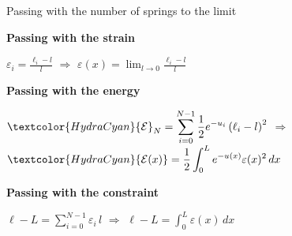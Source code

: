 \begin{frame}{Passing with the number of springs to the limit}

  \vspace{-0.04cm}

  \begin{center}
    \begin{minipage}{0.94\linewidth}

      {\color{HydraWhite}\bfseries\fontsize{8.2}{9.8}\selectfont Passing with the strain\par}
      \vspace{-0.06cm}
      \begin{center}
        {\color{HydraWhite}\fontsize{9.4}{11.8}\selectfont
          $\displaystyle\varepsilon_i=\frac{\ell_i-l}{l}$
        }
        \quad
        {\color{HydraCyan}\fontsize{13}{13}\selectfont$\Rightarrow$}
        \quad
        {\color{HydraWhite}\bfseries\fontsize{9.4}{11.8}\selectfont
          ${\displaystyle\varepsilon(x)=\lim_{l\to0}\frac{\ell_i-l}{l}}$
        }
      \end{center}

      \vspace{0.20cm}

      {\color{HydraWhite}\bfseries\fontsize{8.2}{9.8}\selectfont Passing with the energy\par}
      \vspace{-0.06cm}
      \begin{center}
        {\color{HydraWhite}\fontsize{9}{11.2}\selectfont
          $\displaystyle\textcolor{HydraCyan}{\mathcal E}_N=\sum_{i=0}^{N-1}\frac12e^{-u_i}\left(\ell_i-l\right)^2$
        }
        \quad
        {\color{HydraCyan}\fontsize{13}{13}\selectfont$\Rightarrow$}
        \quad
        {\color{HydraWhite}\bfseries\fontsize{9}{11.2}\selectfont
          ${\displaystyle\textcolor{HydraCyan}{\mathcal E(x)}=\frac12\int_0^L e^{-u(x)}\varepsilon(x)^2\,dx}$
        }
      \end{center}

      \vspace{0.20cm}

      {\color{HydraWhite}\bfseries\fontsize{8.2}{9.8}\selectfont Passing with the constraint\par}
      \vspace{-0.06cm}
      \begin{center}
        {\color{HydraWhite}\fontsize{9.4}{11.8}\selectfont
          $\displaystyle\ell-L=\sum_{i=0}^{N-1}\varepsilon_i\,l$
        }
        \quad
        {\color{HydraCyan}\fontsize{13}{13}\selectfont$\Rightarrow$}
        \quad
        {\color{HydraWhite}\bfseries\fontsize{9.4}{11.8}\selectfont
          ${\displaystyle\ell-L=\int_0^L\varepsilon(x)\,dx}$
        }
      \end{center}

    \end{minipage}
  \end{center}

\end{frame}


